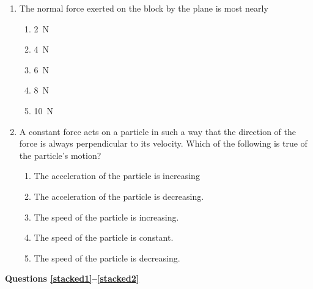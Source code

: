 \documentclass{../../../oss-apphys}
\begin{document}
\begin{multicols}{2}
\begin{enumerate}[resume,leftmargin=18pt]
  \item The normal force exerted on the block by the plane is most nearly
    \begin{enumerate}[nosep,leftmargin=18pt,label=(\Alph*)]
    \item\SI{2}{\newton}
    \item\SI{4}{\newton}
    \item\SI{6}{\newton}
    \item\SI{8}{\newton}
    \item\SI{10}{\newton}
    \end{enumerate}
    \label{plane2}
    \columnbreak
    
  \item A constant force acts on a particle in such a way that the direction of
    the force is always perpendicular to its velocity. Which of the
    following is true of the particle's motion?
    \begin{enumerate}[nosep,leftmargin=18pt,label=(\Alph*)]
    \item The acceleration of the particle is increasing
    \item The acceleration of the particle is decreasing.
    \item The speed of the particle is increasing.
    \item The speed of the particle is constant.
    \item The speed of the particle is decreasing.
    \end{enumerate}
    \vspace{.7in}

  \end{enumerate}
  
  \textbf{Questions \ref{stacked1}--\ref{stacked2}}


\end{multicols}
\end{document}
